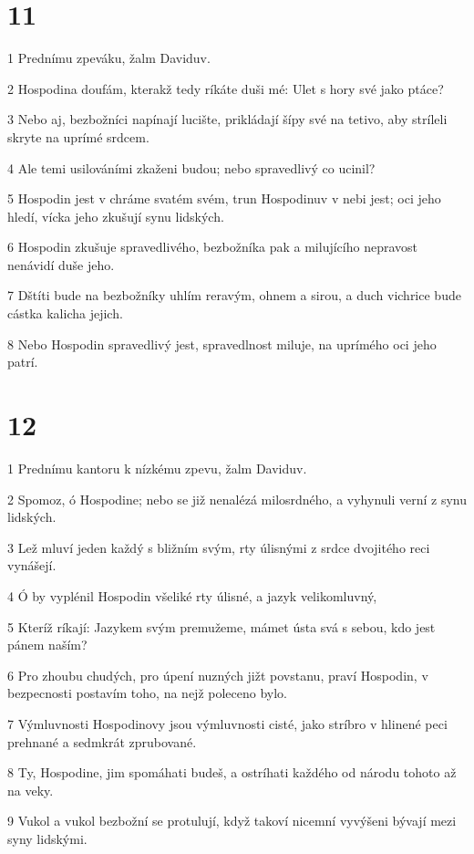 \chapter{11}

\par 1 Prednímu zpeváku, žalm Daviduv.
\par 2 Hospodina doufám, kterakž tedy ríkáte duši mé: Ulet s hory své jako ptáce?
\par 3 Nebo aj, bezbožníci napínají lucište, prikládají šípy své na tetivo, aby stríleli skryte na uprímé srdcem.
\par 4 Ale temi usilováními zkaženi budou; nebo spravedlivý co ucinil?
\par 5 Hospodin jest v chráme svatém svém, trun Hospodinuv v nebi jest; oci jeho hledí, vícka jeho zkušují synu lidských.
\par 6 Hospodin zkušuje spravedlivého, bezbožníka pak a milujícího nepravost nenávidí duše jeho.
\par 7 Dštíti bude na bezbožníky uhlím reravým, ohnem a sirou, a duch vichrice bude cástka kalicha jejich.
\par 8 Nebo Hospodin spravedlivý jest, spravedlnost miluje, na uprímého oci jeho patrí.

\chapter{12}

\par 1 Prednímu kantoru k nízkému zpevu, žalm Daviduv.
\par 2 Spomoz, ó Hospodine; nebo se již nenalézá milosrdného, a vyhynuli verní z synu lidských.
\par 3 Lež mluví jeden každý s bližním svým, rty úlisnými z srdce dvojitého reci vynášejí.
\par 4 Ó by vyplénil Hospodin všeliké rty úlisné, a jazyk velikomluvný,
\par 5 Kteríž ríkají: Jazykem svým premužeme, mámet ústa svá s sebou, kdo jest pánem naším?
\par 6 Pro zhoubu chudých, pro úpení nuzných jižt povstanu, praví Hospodin, v bezpecnosti postavím toho, na nejž poleceno bylo.
\par 7 Výmluvnosti Hospodinovy jsou výmluvnosti cisté, jako stríbro v hlinené peci prehnané a sedmkrát zprubované.
\par 8 Ty, Hospodine, jim spomáhati budeš, a ostríhati každého od národu tohoto až na veky.
\par 9 Vukol a vukol bezbožní se protulují, když takoví nicemní vyvýšeni bývají mezi syny lidskými.

